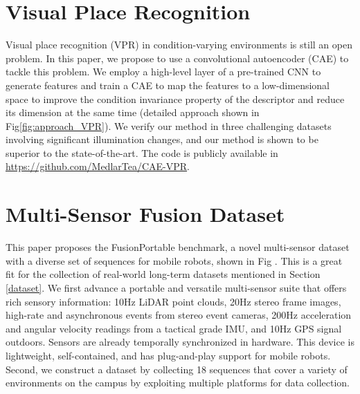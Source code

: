 \section{Visual Place Recognition}
Visual place recognition (VPR) in condition-varying environments is
still an open problem. In this paper\cite{ye2022condition}, we propose to use a convolutional autoencoder (CAE) to tackle this problem. We employ a high-level layer of a pre-trained CNN to generate features and train a CAE to map the features to a low-dimensional space to improve the condition invariance property of the descriptor and reduce its dimension at the same time (detailed approach shown in Fig\ref{fig:approach_VPR}). We verify our method in three challenging datasets involving significant illumination changes, and our method is shown to be superior to the state-of-the-art. The code is publicly available in \url{https://github.com/MedlarTea/CAE-VPR}.
\section{Multi-Sensor Fusion Dataset}
This paper\cite{jiao2022fusionportable} proposes the FusionPortable benchmark, a novel multi-sensor dataset with a diverse set of sequences for mobile robots, shown in Fig . This is a great fit for the collection of real-world long-term datasets mentioned in Section \ref{dataset}. We first advance a portable and versatile multi-sensor suite that offers rich sensory information: 10Hz LiDAR point clouds, 20Hz stereo frame images, high-rate and asynchronous events from stereo event cameras, 200Hz acceleration and angular velocity readings from a tactical grade IMU, and 10Hz GPS signal outdoors. Sensors are already temporally synchronized in hardware. This device is lightweight, self-contained, and has plug-and-play support for mobile robots. Second, we construct a dataset by collecting 18 sequences that cover a variety of environments on the campus by exploiting multiple platforms for data collection. 


